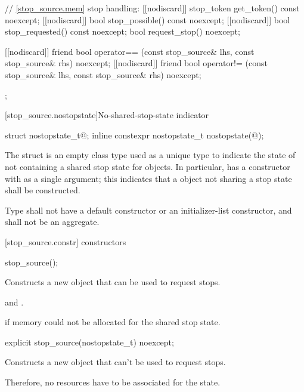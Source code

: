 {\begin{codeblock}
{{    // \ref{stop_source.mem} stop handling:
    [[nodiscard]] stop_token get_token() const noexcept;
    [[nodiscard]] bool stop_possible() const noexcept;
    [[nodiscard]] bool stop_requested() const noexcept;
    bool request_stop() noexcept;

    [[nodiscard]] friend bool operator== (const stop_source& lhs, const stop_source& rhs) noexcept;
    [[nodiscard]] friend bool operator!= (const stop_source& lhs, const stop_source& rhs) noexcept;
  };
}
\end{codeblock}

[stop_source.nostopstate]{No-shared-stop-state indicator}

%
%
\begin{itemdecl}
struct nostopstate_t{@\seebelow@};
inline constexpr nostopstate_t nostopstate(@\unspec@);
\end{itemdecl}

\pnum
The struct  is an empty class type used as a unique type to indicate the state of
not containing a shared stop state for  objects.
In particular,  has a constructor with  as a single argument;
this indicates that a  object not sharing a stop state shall be constructed.

\pnum
Type  shall not have a default constructor or an initializer-list constructor, and shall not be an aggregate.

[stop_source.constr]{ constructors}

%
\begin{itemdecl}
stop_source();
\end{itemdecl}
\begin{itemdescr}
  \pnum\effects Constructs a new  object that can be used to request stops.
  
  \pnum\postconditions {} and .

  \pnum\throws {} if memory could not be allocated for the shared stop state.
\end{itemdescr}

%
\begin{itemdecl}
explicit stop_source(nostopstate_t) noexcept;
\end{itemdecl}
\begin{itemdescr}
  \pnum\effects Constructs a new  object that can't be used to request stops.
                \begin{note} Therefore, no resources have to be associated for the state.  \end{note}


\end{itemdescr}}
